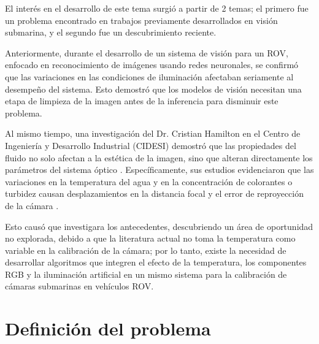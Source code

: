 \documentclass[12pt,letterpaper,spanish,twoside,openright]{report}
\begin{document}
El interés en el desarrollo de este tema surgió a partir de 2 temas; el primero fue un problema encontrado en trabajos previamente desarrollados en visión submarina, y el segundo fue un descubrimiento reciente.

Anteriormente, durante el desarrollo de un sistema de visión para un ROV, enfocado en reconocimiento de imágenes usando redes neuronales, se confirmó que las variaciones en las condiciones de iluminación afectaban seriamente al desempeño del sistema. Esto demostró que los modelos de visión necesitan una etapa de limpieza de la imagen antes de la inferencia para disminuir este problema.

Al mismo tiempo, una investigación del Dr. Cristian Hamilton en el Centro de Ingeniería y Desarrollo Industrial (CIDESI) demostró que las propiedades del fluido no solo afectan a la estética de la imagen, sino que alteran directamente los parámetros del sistema óptico \parencite{10772075}. Específicamente, sus estudios evidenciaron que las variaciones en la temperatura del agua y en la concentración de colorantes o turbidez causan desplazamientos en la distancia focal y el error de reproyección de la cámara \parencite{11176009}.

Esto causó que investigara los antecedentes, descubriendo un área de oportunidad no explorada, debido a que la literatura actual no toma la temperatura como variable en la calibración de la cámara; por lo tanto, existe la necesidad de desarrollar algoritmos que integren el efecto de la temperatura, los componentes RGB y la iluminación artificial en un mismo sistema para la calibración de cámaras submarinas en vehículos ROV.

\section{Definición del problema}

\end{document}
